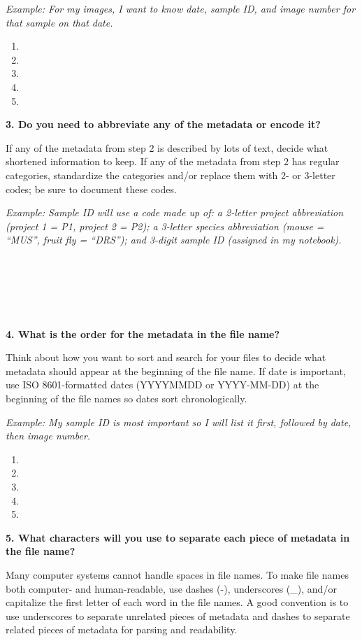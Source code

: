 \documentclass[
]{book}
\providecommand{\tightlist}{%
  \setlength{\itemsep}{0pt}\setlength{\parskip}{0pt}}
\begin{document}
\emph{Example: For my images, I want to know date, sample ID, and image number for that sample on that date.}

\begin{enumerate}
\def\labelenumi{\arabic{enumi}.}
\tightlist
\item
\item
\item
\item
\item
\end{enumerate}

\textbf{3. Do you need to abbreviate any of the metadata or encode it?}

If any of the metadata from step 2 is described by lots of text, decide what shortened information to keep. If any of the metadata from step 2 has regular categories, standardize the categories and/or replace them with 2- or 3-letter codes; be sure to document these codes.

\emph{Example: Sample ID will use a code made up of: a 2-letter project abbreviation (project 1 = P1, project 2 = P2); a 3-letter species abbreviation (mouse = ``MUS'', fruit fly = ``DRS''); and 3-digit sample ID (assigned in my notebook).}

~

~

~

\textbf{4. What is the order for the metadata in the file name?}

Think about how you want to sort and search for your files to decide what metadata should appear at the beginning of the file name. If date is important, use ISO 8601-formatted dates (YYYYMMDD or YYYY-MM-DD) at the beginning of the file names so dates sort chronologically.

\emph{Example: My sample ID is most important so I will list it first, followed by date, then image number.}

\begin{enumerate}
\def\labelenumi{\arabic{enumi}.}
\tightlist
\item
\item
\item
\item
\item
\end{enumerate}

\textbf{5. What characters will you use to separate each piece of metadata in the file name?}

Many computer systems cannot handle spaces in file names. To make file names both computer- and human-readable, use dashes (-), underscores (\_), and/or capitalize the first letter of each word in the file names. A good convention is to use underscores to separate unrelated pieces of metadata and dashes to separate related pieces of metadata for parsing and readability.
\end{document}
